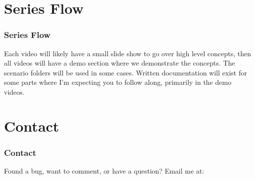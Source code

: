 \documentclass{beamer}
\begin{document}
\section{Series Flow}
\begin{frame}\frametitle{Series Flow}
  Each video will likely have a small slide show to go over high level concepts, then all videos will have a demo section where we demonstrate the concepts.  The scenario folders will be used in some cases.  Written documentation will exist for some parts where I'm expecting you to follow along, primarily in the demo videos.
\end{frame}

\section{Contact}
\begin{frame}\frametitle{Contact}
  Found a bug, want to comment, or have a question?  Email me at: \\
\end{frame}
\end{document}
